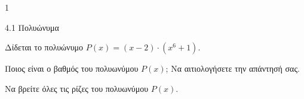 \begin{ylh}{1}
\item 4.1 Πολυώνυμα
\end{ylh}
Δίδεται το πολυώνυμο $P(x) = (x - 2) \cdot (x^{6} + 1)$.
\begin{alist}
\item Ποιος είναι ο βαθμός του πολυωνύμου $P(x)$; Να αιτιολογήσετε την απάντησή σας.
\item Να βρείτε όλες τις ρίζες του πολυωνύμου $P(x)$.
\end{alist}

